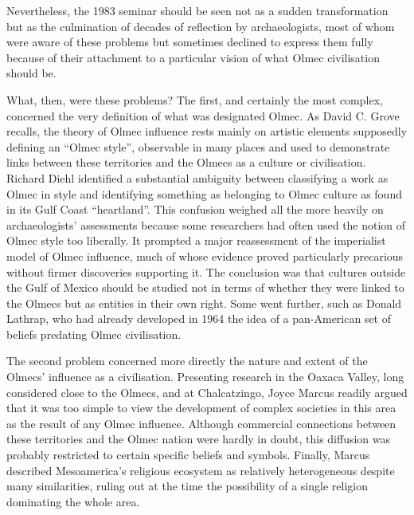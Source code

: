 \documentclass[11pt,a4paper]{article}
\begin{document}
Nevertheless, the 1983 seminar should be seen not as a sudden transformation but as the culmination of decades of reflection by archaeologists, most of whom were aware of these problems but sometimes declined to express them fully because of their attachment to a particular vision of what Olmec civilisation should be.

What, then, were these problems? The first, and certainly the most complex, concerned the very definition of what was designated Olmec. As David C. Grove recalls, the theory of Olmec influence rests mainly on artistic elements supposedly defining an ``Olmec style'', observable in many places and used to demonstrate links between these territories and the Olmecs as a culture or civilisation. Richard Diehl identified a substantial ambiguity between classifying a work as Olmec in style and identifying something as belonging to Olmec culture as found in its Gulf Coast ``heartland''. This confusion weighed all the more heavily on archaeologists' assessments because some researchers had often used the notion of Olmec style too liberally. It prompted a major reassessment of the imperialist model of Olmec influence, much of whose evidence proved particularly precarious without firmer discoveries supporting it. The conclusion was that cultures outside the Gulf of Mexico should be studied not in terms of whether they were linked to the Olmecs but as entities in their own right. Some went further, such as Donald Lathrap, who had already developed in 1964 the idea of a pan-American set of beliefs predating Olmec civilisation.

The second problem concerned more directly the nature and extent of the Olmecs' influence as a civilisation. Presenting research in the Oaxaca Valley, long considered close to the Olmecs, and at Chalcatzingo, Joyce Marcus readily argued that it was too simple to view the development of complex societies in this area as the result of any Olmec influence. Although commercial connections between these territories and the Olmec nation were hardly in doubt, this diffusion was probably restricted to certain specific beliefs and symbols. Finally, Marcus described Mesoamerica's religious ecosystem as relatively heterogeneous despite many similarities, ruling out at the time the possibility of a single religion dominating the whole area.
\end{document}
